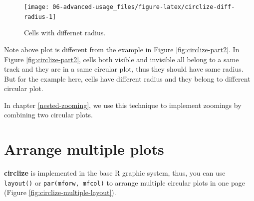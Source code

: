 \documentclass[]{book}
\begin{document}
\begin{figure}

{\centering \texttt{[image: 06-advanced-usage\_files/figure-latex/circlize-diff-radius-1]} 

}

\caption{Cells with differnet radius.}\label{fig:circlize-diff-radius}
\end{figure}

Note above plot is different from the example in Figure
\ref{fig:circlize-part2}. In Figure \ref{fig:circlize-part2}, cells both
visible and invisible all belong to a same track and they are in a same
circular plot, thus they should have same radius. But for the example
here, cells have different radius and they belong to different circular
plot.

In chapter \ref{nested-zooming}, we use this technique to implement
zoomings by combining two circular plots.

\section{Arrange multiple plots}\label{arrange-multiple-plots}

\textbf{circlize} is implemented in the base R graphic system, thus, you
can use \texttt{layout()} or \texttt{par(mforw,\ mfcol)} to arrange
multiple circular plots in one page (Figure
\ref{fig:circlize-multiple-layout}).
\end{document}
